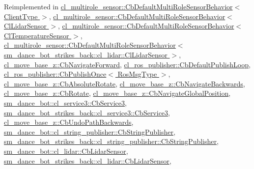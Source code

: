 Reimplemented in \hyperlink{classcl__multirole__sensor_1_1CbDefaultMultiRoleSensorBehavior_a5ac29f93cc91e23715f51ade94467cae}{cl\+\_\+multirole\+\_\+sensor\+::\+Cb\+Default\+Multi\+Role\+Sensor\+Behavior$<$ Client\+Type $>$}, \hyperlink{classcl__multirole__sensor_1_1CbDefaultMultiRoleSensorBehavior_a5ac29f93cc91e23715f51ade94467cae}{cl\+\_\+multirole\+\_\+sensor\+::\+Cb\+Default\+Multi\+Role\+Sensor\+Behavior$<$ Cl\+Lidar\+Sensor $>$}, \hyperlink{classcl__multirole__sensor_1_1CbDefaultMultiRoleSensorBehavior_a5ac29f93cc91e23715f51ade94467cae}{cl\+\_\+multirole\+\_\+sensor\+::\+Cb\+Default\+Multi\+Role\+Sensor\+Behavior$<$ Cl\+Temperature\+Sensor $>$}, \hyperlink{classcl__multirole__sensor_1_1CbDefaultMultiRoleSensorBehavior_a5ac29f93cc91e23715f51ade94467cae}{cl\+\_\+multirole\+\_\+sensor\+::\+Cb\+Default\+Multi\+Role\+Sensor\+Behavior$<$ sm\+\_\+dance\+\_\+bot\+\_\+strikes\+\_\+back\+::cl\+\_\+lidar\+::\+Cl\+Lidar\+Sensor $>$}, \hyperlink{classcl__move__base__z_1_1CbNavigateForward_af9a2e49071de287922c3f5963a079b95}{cl\+\_\+move\+\_\+base\+\_\+z\+::\+Cb\+Navigate\+Forward}, \hyperlink{classcl__ros__publisher_1_1CbDefaultPublishLoop_a6e6cfb477cbefc510ca7b55a061545e4}{cl\+\_\+ros\+\_\+publisher\+::\+Cb\+Default\+Publish\+Loop}, \hyperlink{classcl__ros__publisher_1_1CbPublishOnce_afaed71bc2694ec1837278d5f931a76e1}{cl\+\_\+ros\+\_\+publisher\+::\+Cb\+Publish\+Once$<$ Ros\+Msg\+Type $>$}, \hyperlink{classcl__move__base__z_1_1CbAbsoluteRotate_a10418ea360809fa649d295716b152b2b}{cl\+\_\+move\+\_\+base\+\_\+z\+::\+Cb\+Absolute\+Rotate}, \hyperlink{classcl__move__base__z_1_1CbNavigateBackwards_a545a5282f0ef6b0080b46002d6037567}{cl\+\_\+move\+\_\+base\+\_\+z\+::\+Cb\+Navigate\+Backwards}, \hyperlink{classcl__move__base__z_1_1CbRotate_a316ee51ecfd3f10fd1edae0d7d3b26c0}{cl\+\_\+move\+\_\+base\+\_\+z\+::\+Cb\+Rotate}, \hyperlink{classcl__move__base__z_1_1CbNavigateGlobalPosition_a66d8b0555ef2945bc108dcd5171be292}{cl\+\_\+move\+\_\+base\+\_\+z\+::\+Cb\+Navigate\+Global\+Position}, \hyperlink{classsm__dance__bot_1_1cl__service3_1_1CbService3_ae9e3796b507ad96cc0890fec0f64a4b7}{sm\+\_\+dance\+\_\+bot\+::cl\+\_\+service3\+::\+Cb\+Service3}, \hyperlink{classsm__dance__bot__strikes__back_1_1cl__service3_1_1CbService3_a09a2fda38973e1e3915b63a47ca67ed1}{sm\+\_\+dance\+\_\+bot\+\_\+strikes\+\_\+back\+::cl\+\_\+service3\+::\+Cb\+Service3}, \hyperlink{classcl__move__base__z_1_1CbUndoPathBackwards_a32e680530375b62c7053bf173f6b2b1b}{cl\+\_\+move\+\_\+base\+\_\+z\+::\+Cb\+Undo\+Path\+Backwards}, \hyperlink{classsm__dance__bot_1_1cl__string__publisher_1_1CbStringPublisher_a7aa533578e820ee90d92d15b85d42e9b}{sm\+\_\+dance\+\_\+bot\+::cl\+\_\+string\+\_\+publisher\+::\+Cb\+String\+Publisher}, \hyperlink{classsm__dance__bot__strikes__back_1_1cl__string__publisher_1_1CbStringPublisher_a2c3963143fe180a5e5f939362857d2e0}{sm\+\_\+dance\+\_\+bot\+\_\+strikes\+\_\+back\+::cl\+\_\+string\+\_\+publisher\+::\+Cb\+String\+Publisher}, \hyperlink{structsm__dance__bot_1_1cl__lidar_1_1CbLidarSensor_aad3468a6ae78999c9fd01bdb81b42a49}{sm\+\_\+dance\+\_\+bot\+::cl\+\_\+lidar\+::\+Cb\+Lidar\+Sensor}, \hyperlink{structsm__dance__bot__strikes__back_1_1cl__lidar_1_1CbLidarSensor_a82d0250dcf2d4e9b12ccd528a5d87002}{sm\+\_\+dance\+\_\+bot\+\_\+strikes\+\_\+back\+::cl\+\_\+lidar\+::\+Cb\+Lidar\+Sensor}, 